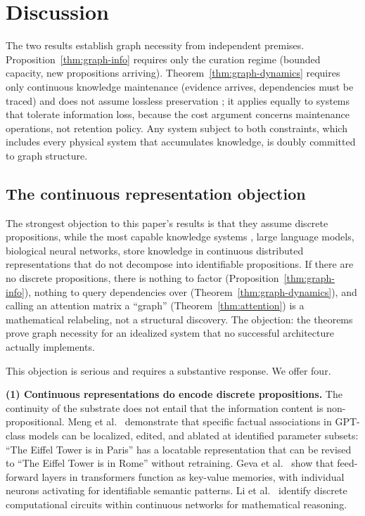 \documentclass[11pt]{article}
\theoremstyle{definition}
\begin{document}
\section{Discussion}
\label{sec:discussion}

The two results establish graph necessity from independent premises.
Proposition~\ref{thm:graph-info} requires only the curation regime (bounded
capacity, new propositions arriving). Theorem~\ref{thm:graph-dynamics}
requires only continuous knowledge maintenance (evidence arrives,
dependencies must be traced) and does not assume lossless preservation
; it applies equally to systems that tolerate information loss,
because the cost argument concerns maintenance operations, not
retention policy. Any system subject to both constraints,
which includes every physical system that accumulates knowledge, is
doubly committed to graph structure.

\subsection{The continuous representation objection}

The strongest objection to this paper's results is that they
assume discrete propositions, while the most capable knowledge systems
, large language models, biological neural networks, store
knowledge in continuous distributed representations that do not
decompose into identifiable propositions. If there are no discrete
propositions, there is nothing to factor
(Proposition~\ref{thm:graph-info}), nothing to query dependencies over
(Theorem~\ref{thm:graph-dynamics}), and calling an attention matrix a
``graph'' (Theorem~\ref{thm:attention}) is a mathematical relabeling,
not a structural discovery. The objection: the theorems prove graph
necessity for an idealized system that no successful architecture
actually implements.

This objection is serious and requires a substantive response. We offer
four.

\textbf{(1) Continuous representations do encode discrete
propositions.}
The continuity of the substrate does not entail that the information
content is non-propositional. Meng et al.\ \cite{Meng2022} demonstrate
that specific factual associations in GPT-class models can be localized,
edited, and ablated at identified parameter subsets: ``The Eiffel Tower
is in Paris'' has a locatable representation that can be revised to ``The Eiffel Tower is in Rome'' without retraining. Geva
et al.\ \cite{Geva2021} show that feed-forward layers in transformers
function as key-value memories, with individual neurons activating for
identifiable semantic patterns. Li et al.\ \cite{Li2024} identify discrete computational circuits
within continuous networks for mathematical reasoning.
\end{document}
